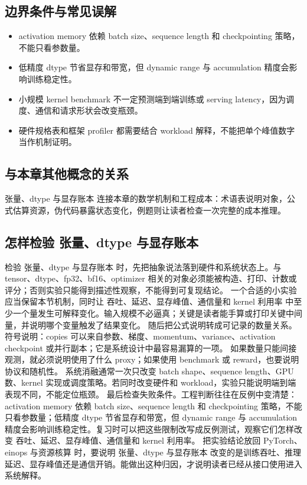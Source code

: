 \documentclass[a4paper]{article}
\begin{document}
\subsection{边界条件与常见误解}
\begin{itemize}
\item activation memory 依赖 batch size、sequence length 和 checkpointing 策略，不能只看参数量。
\item 低精度 dtype 节省显存和带宽，但 dynamic range 与 accumulation 精度会影响训练稳定性。
\item 小规模 kernel benchmark 不一定预测端到端训练或 serving latency，因为调度、通信和请求形状会改变瓶颈。
\item 硬件规格表和框架 profiler 都需要结合 workload 解释，不能把单个峰值数字当作机制证明。
\end{itemize}
\subsection{与本章其他概念的关系}
张量、dtype 与显存账本 连接本章的数学机制和工程成本：术语表说明对象，公式估算资源，伪代码暴露状态变化，例题则让读者检查一次完整的成本推理。
\subsection{怎样检验 张量、dtype 与显存账本}
检验 张量、dtype 与显存账本 时，先把抽象说法落到硬件和系统状态上。与 tensor、dtype、fp32、bf16、optimizer 相关的对象必须能被构造、打印、计数或评分；否则实验只能得到描述性观察，不能得到可复现结论。
一个合适的小实验应当保留本节机制，同时让 吞吐、延迟、显存峰值、通信量和 kernel 利用率 中至少一个量发生可解释变化。输入规模不必逼真；关键是读者能手算或打印关键中间量，并说明哪个变量触发了结果变化。
随后把公式说明转成可记录的数量关系。符号说明：copies 可以来自参数、梯度、momentum、variance、activation checkpoint 或并行副本；它是系统设计中最容易漏算的一项。 如果数量只能间接观测，就必须说明使用了什么 proxy；如果使用 benchmark 或 reward，也要说明协议和随机性。
系统消融通常一次只改变 batch shape、sequence length、GPU 数、kernel 实现或调度策略。若同时改变硬件和 workload，实验只能说明端到端表现不同，不能定位瓶颈。
最后检查失败条件。工程判断往往在反例中变清楚：activation memory 依赖 batch size、sequence length 和 checkpointing 策略，不能只看参数量；低精度 dtype 节省显存和带宽，但 dynamic range 与 accumulation 精度会影响训练稳定性。复习时可以把这些限制改写成反例测试，观察它们怎样改变 吞吐、延迟、显存峰值、通信量和 kernel 利用率。
把实验结论放回 PyTorch、einops 与资源核算 时，要说明 张量、dtype 与显存账本 改变的是训练吞吐、推理延迟、显存峰值还是通信开销。能做出这种归因，才说明读者已经从接口使用进入系统解释。
\end{document}
